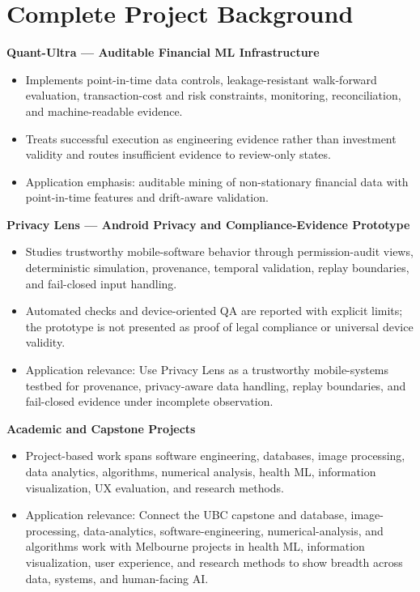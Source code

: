 \documentclass[11pt]{article}
\begin{document}
\section*{Complete Project Background}
\textbf{Quant-Ultra --- Auditable Financial ML Infrastructure}
\begin{itemize}
\item Implements point-in-time data controls, leakage-resistant walk-forward evaluation, transaction-cost and risk constraints, monitoring, reconciliation, and machine-readable evidence.
\item Treats successful execution as engineering evidence rather than investment validity and routes insufficient evidence to review-only states.
\item Application emphasis: auditable mining of non-stationary financial data with point-in-time features and drift-aware validation.
\end{itemize}

\textbf{Privacy Lens --- Android Privacy and Compliance-Evidence Prototype}
\begin{itemize}
\item Studies trustworthy mobile-software behavior through permission-audit views, deterministic simulation, provenance, temporal validation, replay boundaries, and fail-closed input handling.
\item Automated checks and device-oriented QA are reported with explicit limits; the prototype is not presented as proof of legal compliance or universal device validity.
\item Application relevance: Use Privacy Lens as a trustworthy mobile-systems testbed for provenance, privacy-aware data handling, replay boundaries, and fail-closed evidence under incomplete observation.
\end{itemize}

\textbf{Academic and Capstone Projects}
\begin{itemize}
\item Project-based work spans software engineering, databases, image processing, data analytics, algorithms, numerical analysis, health ML, information visualization, UX evaluation, and research methods.
\item Application relevance: Connect the UBC capstone and database, image-processing, data-analytics, software-engineering, numerical-analysis, and algorithms work with Melbourne projects in health ML, information visualization, user experience, and research methods to show breadth across data, systems, and human-facing AI.
\end{itemize}
\end{document}
